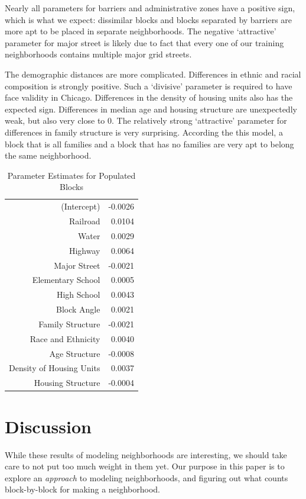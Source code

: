 \documentclass[12pt,letter]{article}\usepackage[]{graphicx}\usepackage[]{color}
\begin{document}
Nearly all parameters for barriers and administrative zones have a
positive sign, which is what we expect: dissimilar blocks and blocks
separated by barriers are more apt to be placed in separate
neighborhoods. The negative `attractive' parameter for major street is
likely due to fact that every one of our training neighborhoods
contains multiple major grid streets.

The demographic distances are more complicated. Differences in ethnic
and racial composition is strongly positive. Such a `divisive'
parameter is required to have face validity in Chicago. Differences in
the density of housing units also has the expected sign. Differences
in median age and housing structure are unexpectedly weak, but also
very close to 0. The relatively strong `attractive' parameter for
differences in family structure is very surprising. According the this
model, a block that is all families and a block that has no families
are very apt to belong the same neighborhood. 

\begin{table}[ht]
\centering
\begin{tabular}{rr}
  \hline
 &  \\ 
  \hline
(Intercept) & -0.0026 \\ 
  Railroad & 0.0104 \\ 
  Water & 0.0029 \\ 
  Highway & 0.0064 \\ 
  Major Street & -0.0021 \\ 
  Elementary School & 0.0005 \\ 
  High School & 0.0043 \\ 
  Block Angle & 0.0021 \\ 
  Family Structure & -0.0021 \\ 
  Race and Ethnicity & 0.0040 \\ 
  Age Structure & -0.0008 \\ 
  Density of Housing Units & 0.0037 \\ 
  Housing Structure & -0.0004 \\ 
   \hline
\end{tabular}
\caption{Parameter Estimates for Populated Blocks} 
\label{tab:parameters}
\end{table}



\section*{Discussion}
While these results of modeling neighborhoods are interesting, we
should take care to not put too much weight in them yet. Our purpose
in this paper is to explore an \emph{approach} to modeling
neighborhoods, and figuring out what counts block-by-block for making
a neighborhood.
\end{document}
